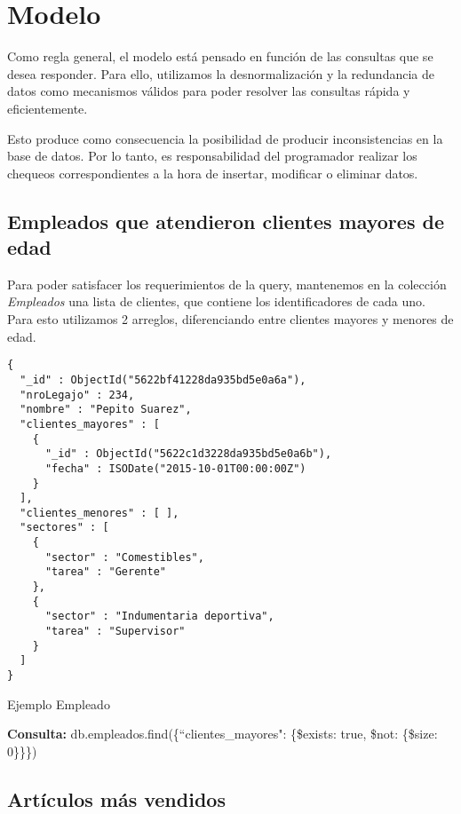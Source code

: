 \section{Modelo}

Como regla general, el modelo está pensado en función de las consultas que se desea responder.
Para ello, utilizamos la desnormalización y la redundancia de datos como mecanismos válidos para
poder resolver las consultas rápida y eficientemente.

Esto produce como consecuencia la posibilidad de producir inconsistencias en la base de datos.
Por lo tanto, es responsabilidad del programador realizar los chequeos correspondientes a la hora
de insertar, modificar o eliminar datos.

\subsection{Empleados que atendieron clientes mayores de edad}

Para poder satisfacer los requerimientos de la query, mantenemos en la colección \emph{Empleados}
una lista de clientes, que contiene los identificadores de cada uno. Para esto utilizamos 2 arreglos,
diferenciando entre clientes mayores y menores de edad.

\begin{listing}
\begin{verbatim}
{
  "_id" : ObjectId("5622bf41228da935bd5e0a6a"),
  "nroLegajo" : 234,
  "nombre" : "Pepito Suarez",
  "clientes_mayores" : [
    {
      "_id" : ObjectId("5622c1d3228da935bd5e0a6b"),
      "fecha" : ISODate("2015-10-01T00:00:00Z")
    }
  ],
  "clientes_menores" : [ ],
  "sectores" : [
    {
      "sector" : "Comestibles",
      "tarea" : "Gerente"
    },
    {
      "sector" : "Indumentaria deportiva",
      "tarea" : "Supervisor"
    }
  ]
}
\end{verbatim}
\caption{Ejemplo Empleado}
\label{json-example}
\end{listing}

\textbf{Consulta: } db.empleados.find(\{``clientes_mayores": \{\$exists: true, \$not: \{\$size: 0\}\}\})

\vspace{3em}

\subsection{Artículos más vendidos}

